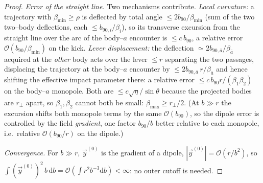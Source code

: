 \documentclass[11pt]{article}
\newcommand{\dd}{\mathrm{d}}
\newcommand{\rp}{r_\perp}
\newcommand{\bnt}{b_{90}}
\newcommand{\order}[1]{\mathcal O\!\left(#1\right)}
\begin{document}
\begin{proof}
\emph{Error of the straight line.} Two mechanisms contribute. \emph{Local curvature:} a trajectory
with $\beta_{\min}\ge\rho$ is deflected by total
angle $\le 2\bnt/\beta_{\min}$ (sum of the two two--body deflections, each $\le b_{90,i}/\beta_i$),
so its transverse excursion from the straight line over the arc of the body--$a$ encounter is
$\le c\,\bnt$, a relative error $\order{\bnt/\beta_{\min}}$ on the kick. \emph{Lever displacement:}
the deflection $\simeq2b_{90,\bar a}/\beta_{\bar a}$ acquired at the \emph{other} body acts over
the lever $\le r$ separating the two passages, displacing the trajectory at the body--$a$ encounter
by $\le2b_{90,\bar a}\,r/\beta_{\bar a}$ and hence shifting the effective impact parameter there:
a relative error $\le c\,\bnt r/(\beta_1\beta_2)$ on the body--$a$ monopole. Both are
$\le c\sqrt\eta/\sin\theta$ because the projected bodies are $\rp$ apart, so $\beta_1,\beta_2$
cannot both be small: $\beta_{\max}\ge\rp/2$. (At $b\gg r$ the
excursion shifts both monopole terms by the same $\order\bnt$, so the dipole error is controlled by
the field \emph{gradient}, one factor $\bnt/b$ better relative to each monopole, i.e.\ relative
$\order{\bnt/r}$ on the dipole.)

\emph{Convergence.} For $b\gg r$, $\vec y^{(0)}$ is the gradient of a dipole,
$|\vec y^{(0)}|=\order{r/b^2}$, so $\int(\vec y^{(0)})^2\,b\,\dd b=\order{\int r^2 b^{-3}\dd b}<\infty$:
no outer cutoff is needed.


\end{proof}
\end{document}
